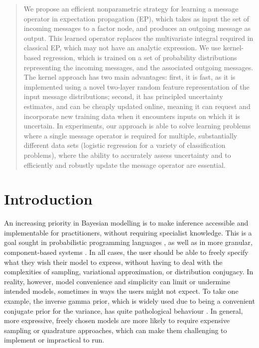 \documentclass[english]{article}
\theoremstyle{plain}
\theoremstyle{plain}
\newcommand{\wjnote}[1]{ }
\begin{document}
\begin{abstract}

We propose an efficient nonparametric strategy for learning a message operator in expectation propagation (EP), which takes as input the set of incoming messages to a factor node, and produces an outgoing message as output. This learned operator replaces the multivariate integral required in classical EP, which may not have an analytic expression. We use kernel-based regression, which is trained on a set of probability distributions representing the incoming messages, and the associated outgoing messages. The kernel approach has two main advantages: first, it is fast, as it is implemented using a novel two-layer random feature representation of the input message distributions; second, it has principled uncertainty estimates, and can be cheaply updated online, meaning it can request and incorporate new training data when it encounters inputs on which it is uncertain.  In experiments, our approach is able to solve learning problems where a single message operator is required for multiple, substantially different data sets (logistic regression for a variety of classification problems), where the ability to accurately assess uncertainty and to efficiently and robustly update the message operator are essential.

\end{abstract}

\section{Introduction}




An increasing priority in Bayesian modelling is to make inference accessible and implementable for practitioners,
without  requiring specialist knowledge.
This
is a goal sought in probabilistic programming languages \citep{WinGooStuSis11,GooManRoyBonTen08}, 
as well as in more granular, component-based
systems \citep{SDT2014,Minka2014}. In all cases, the user
should be able to freely specify what they wish their model to express,
without having to deal with the complexities of sampling, variational
approximation, or distribution conjugacy.  In reality, however, model convenience and
simplicity can  limit
or undermine intended models, sometimes in ways the users
might not expect. To take one example, the inverse gamma prior, which is
widely used due to being a convenient
conjugate prior for the variance, has quite pathological behaviour \citep{Gelman2006}.
In general, more expressive, freely chosen models are more likely
to require expensive sampling or quadrature approaches, which can make
them challenging to implement or impractical to run.
\end{document}
